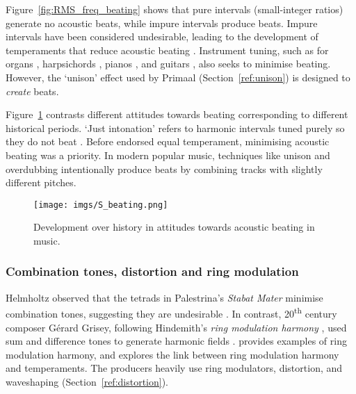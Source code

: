 \documentclass{article}
\begin{document}
Figure~\ref{fig:RMS_freq_beating} shows that pure intervals (small-integer ratios) generate no acoustic beats, while impure intervals produce beats. Impure intervals have been considered undesirable, leading to the development of temperaments that reduce acoustic beating \citep{lindley2001temperaments}. Instrument tuning, such as for organs \citep{baggaley2023mechanisms}, harpsichords \citep[p.~255]{christensen2006cambridge}, pianos \citep[p.~87]{white1917modern}, and guitars \citep{klickstein1993tuning}, also seeks to minimise beating. However, the `unison' effect used by Primaal (Section~\ref{ref:unison}) is designed to \emph{create} beats.

Figure~\ref{fig:S_beating} contrasts different attitudes towards beating corresponding to different historical periods. `Just intonation' refers to harmonic intervals tuned purely so they do not beat \citep{lindley2001justintonation}. Before \citet{rameau1737generation} endorsed equal temperament, minimising acoustic beating was a priority. In modern popular music, techniques like unison and overdubbing \citep[p.~31]{huber2013modern} intentionally produce beats by combining tracks with slightly different pitches.





\begin{figure}
  \centering
  \texttt{[image: imgs/S\_beating.png]}
  \caption{Development over history in attitudes towards acoustic beating in music.}
\label{fig:S_beating}
\end{figure}


\subsubsection{Combination tones, distortion and ring modulation}\label{sec:combinationtones}


Helmholtz observed that the tetrads in Palestrina's \textit{Stabat Mater} minimise combination tones, suggesting they are undesirable \citep[p.~225]{kursell2015third,helmoltz1885sensations}. In contrast, 20\textsuperscript{th} century composer G\'erard Grisey, following Hindemith's \emph{ring modulation harmony} \citep{hindemith1941craft}, used sum and difference tones to generate harmonic fields \citep[p.~52]{anderson2000provisional}. \citet{emmerson1977ring} provides examples of ring modulation harmony, and \citet{costa2019modeling} explores the link between ring modulation harmony and temperaments. The producers heavily use ring modulators, distortion, and waveshaping (Section~\ref{ref:distortion}).
\end{document}

